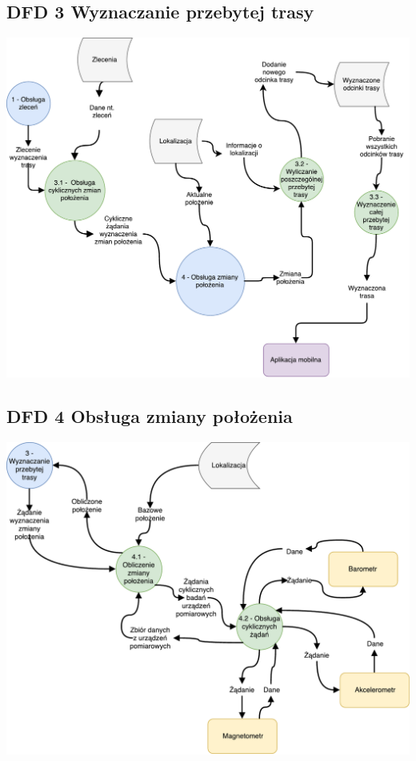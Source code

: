 \documentclass[11pt]{article}
\begin{document}
	\subsection{DFD 3 Wyznaczanie przebytej trasy}
	\begin{center}
		\includegraphics[scale=0.6]{DFD3.pdf}
	\end{center}
	\subsection{DFD 4 Obsługa zmiany położenia}
	\begin{center}
		\includegraphics[scale=0.7]{DFD4.pdf}
	\end{center}
	\newpage
\end{document}
